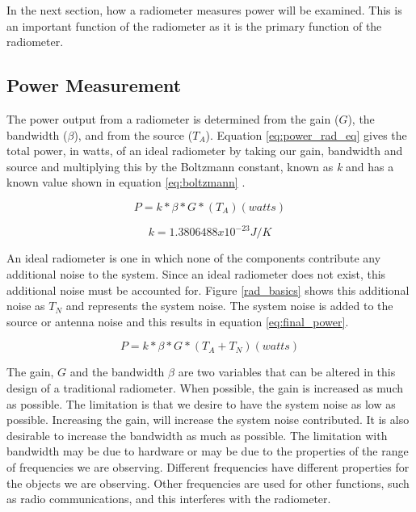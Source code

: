 In the next section, how a radiometer measures power will be examined.  This is an important function of the radiometer as it is the primary function of the radiometer.

\subsection{Power Measurement}\label{pwr_measurement}


The power output from a radiometer is determined from the gain ($G$), the bandwidth ($\beta$), and from the source ($T_{A}$).  Equation \ref{eq:power_rad_eq} gives the total power, in watts, of an ideal radiometer by taking our gain, bandwidth and source and multiplying this by the Boltzmann constant, known as \textit{k} and has a known value shown in equation \ref{eq:boltzmann} .

\begin{equation} \label{eq:power_rad_eq}
P=k*\beta*G*(T_{A}) (watts)
\end{equation}

\begin{equation} \label{eq:boltzmann}
k = 1.3806488 x 10^{-23} J/K
\end{equation}

An ideal radiometer is one in which none of the components contribute any additional noise to the system.  Since an ideal radiometer does not exist, this additional noise must be accounted for.  Figure \ref{rad_basics} shows this additional noise as $T_{N}$ and represents the system noise.  The system noise is added to the source or antenna noise and this results in equation \ref{eq:final_power}.

\begin{equation} \label{eq:final_power}
P=k*\beta*G*(T_{A}+T_{N}) (watts)
\end{equation}

The gain, $G$ and the bandwidth $\beta$ are two variables that can be altered in this design of a traditional radiometer.  When possible, the gain is increased as much as possible.  The limitation is that we desire to have the system noise as low as possible.  Increasing the gain, will increase the system noise contributed.  It is also desirable to increase the bandwidth as much as possible.  The limitation with bandwidth may be due to hardware or may be due to the properties of the range of frequencies we are observing.  Different frequencies have different properties for the objects we are observing.  Other frequencies are used for other functions, such as radio communications, and this interferes with the radiometer.  

